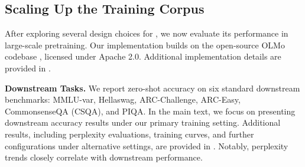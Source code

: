 \subsection{Scaling Up the Training Corpus}\label{sec:exps_dolma}

\begin{table}[t]
\caption{Zero-shot evaluation accuracy on downstream tasks. Models with f-gram embedding layers show clear improvements over the baseline models.  }
\label{table:dolma_downstream}
\centering
\setlength{\tabcolsep}{5pt}
\end{table}


After exploring several design choices for \SCONE, we now evaluate its performance in large-scale pretraining. Our implementation builds on the open-source OLMo codebase \citep{OLMo}, licensed under Apache 2.0. Additional implementation details are provided in .

\textbf{Downstream Tasks.} We report zero-shot accuracy on six standard downstream benchmarks: MMLU-var, Hellaswag, ARC-Challenge, ARC-Easy, CommonsenseQA (CSQA), and PIQA. In the main text, we focus on presenting downstream accuracy results under our primary training setting. Additional results, including perplexity evaluations, training curves, and further \SCONE configurations under alternative settings, are provided in . Notably, perplexity trends closely correlate with downstream performance.

